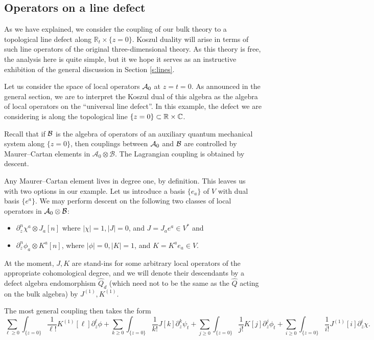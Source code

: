 \documentclass[11pt]{amsart}
\begin{document}
\subsection{Operators on a line defect}
As we have explained, we consider the coupling of our bulk theory to a topological line defect along $\mathbb{R}_t \times \{z=0\}$. 
Koszul duality will arise in terms of such line operators of the original three-dimensional theory. 
As this theory is free, the analysis here is quite simple, but it we hope it serves as an instructive exhibition of the general discussion in Section \ref{s:lines}. 

Let us consider the space of local operators $\mathcal A_0$ at $z=t=0$. 
As announced in the general section, we are to interpret the Koszul dual of this algebra as the algebra of local operators on the ``universal line defect''.
In this example, the defect we are considering is along the topological line $\{z=0\} \subset \mathbb R \times \mathbb C$. 

Recall that if $\mathcal B$ is the algebra of operators of an auxiliary quantum mechanical system along $\{z=0\}$, then couplings between $\mathcal A_0$ and $\mathcal B$ are controlled by Maurer--Cartan elements in $\mathcal{A}_0\otimes \mathcal{B}$.
The Lagrangian coupling is obtained by descent. 

Any Maurer--Cartan element lives in degree one, by definition. This leaves us with two options in our example. 
Let us introduce a basis $\{e_a\}$ of $V$ with dual basis $\{e^a\}$.
We may perform descent on the following two classes of local operators in $\mathcal A_0 \otimes \mathcal B$:
\begin{itemize}
\item $\partial_z^n \chi^a \otimes J_a[n]$ where $|\chi| = 1, |J|=0$, and $J = J_a e^a \in V^*$ and
\item $\partial_z^n \phi_a \otimes K^a[n]$, where $|\phi|=0, |K| = 1$, and $K = K^a e_a \in V$. 
\end{itemize}
At the moment, $J, K$ are stand-ins for some arbitrary local operators of the appropriate cohomological degree, and we will denote their descendants by a defect algebra endomorphism $\hat{Q}_{d}$ (which need not to be the same as the $\hat{Q}$ acting on the bulk algebra) by $J^{(1)}, K^{(1)}$. 

The most general coupling then takes the form
\[
\sum_{\ell \geq 0} \int_{\{z=0\}} \frac{1}{\ell!} K^{(1)} [\ell] \partial_z^\ell \phi + \sum_{k \geq 0} \int_{\{z=0\}} \frac{1}{k!} J[k] \partial_z^k \psi_t  + \sum_{j \geq 0} \int_{\{z=0\}} \frac{1}{j!} K[j] \partial_z^j \phi_t +  \sum_{i \geq 0} \int_{\{z=0\}} \frac{1}{i!} J^{(1)}[i] \partial_z^i \chi.
\] 
\end{document}
